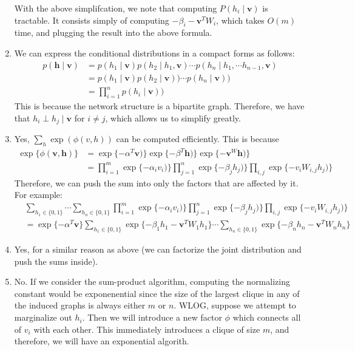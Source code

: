\documentclass[12pt]{article}
\begin{document}
\begin{enumerate}[label=(\alph*)]
With the above simplifcation, we note that computing $P(h_i \mid \textbf{v})$ is tractable. It consists simply of computing $-\beta_i - \textbf{v}^TW_i$, which takes $O(m)$ time, and plugging the result into the above formula.
\item We can express the conditional distributions in a compact forms as follows:
\begin{align*}
p(\textbf{h} \mid \textbf{v}) &= p(h_1 \mid \textbf{v})p(h_2 \mid h_1, \textbf{v}) \cdots p(h_n \mid h_1, \cdots h_{n-1}, \textbf{v}) \\
&= p(h_1 \mid \textbf{v})p(h_2 \mid \textbf{v})) \cdots p(h_n \mid \textbf{v})) \\
&= \prod_{i=1}^{n} p(h_i \mid \textbf{v}))
\end{align*}
This is because the network structure is a bipartite graph. Therefore, we have that $h_i \perp h_j \mid \textbf{v}$ for $i \neq j$, which allows us to simplify greatly.
\item Yes, $\sum_{h} \exp(\phi(v,h))$ can be computed efficiently. This is because
\begin{align*}
\exp\{\phi(\textbf{v}, \textbf{h})\} &= \exp\{-\alpha^T\textbf{v})\} \exp\{-\beta^T\textbf{h})\} \exp\{-\textbf{v}^W\textbf{h})\} \\
&= \prod_{i=1}^m \exp\{-\alpha_iv_i)\} \prod_{j=1}^n \exp\{-\beta_jh_j)\}\prod_{i,j} \exp\{-v_iW_{i,j}h_j)\}
\end{align*}
Therefore, we can push the sum into only the factors that are affected by it. For example:
\begin{align*}
&\sum_{h_1 \in \{0,1\}}\cdots\sum_{h_n \in \{0,1\}} \prod_{i=1}^m \exp\{-\alpha_iv_i)\} \prod_{j=1}^n \exp\{-\beta_jh_j)\}\prod_{i,j} \exp\{-v_iW_{i,j}h_j)\} \\ &= \exp\{-\alpha^T \textbf{v}\} \sum_{h_1 \in \{0,1\}} \exp\{-\beta_1 h_1 - \textbf{v}^TW_1h_1\} \cdots \sum_{h_n \in \{0,1\}} \exp\{-\beta_n h_n - \textbf{v}^TW_nh_n\} 
\end{align*}

\item Yes, for a similar reason as above (we can factorize the joint distribution and push the sums inside).
\item No. If we consider the sum-product algorithm, computing the normalizing constant would be exponenential since the size of the largest clique in any of the induced graphs is always either $m$ or $n$. WLOG, suppose we attempt to marginalize out $h_i$. Then we will introduce a new factor $\phi$ which connects all of $v_i$ with each other. This immediately introduces a clique of size $m$, and therefore, we will have an exponential algorith.
\end{enumerate}
\end{document}
